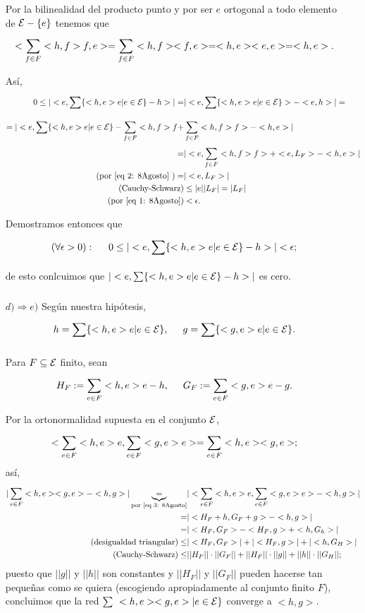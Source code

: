 \begin{itemize}
Por la bilinealidad del producto punto y por
ser $e$ ortogonal a todo elemento de $\mathcal{E}-\{ e \}$
tenemos que
\begin{equation} \label{eq 2: 8Agosto}
<\sum\limits_{f \in F}^{}<h,f>f, e> = \sum\limits_{f \in F}^{}<h,f><f,e>
= <h,e> <e,e>=<h,e>.
\end{equation}

Así,
\begin{align*}
0 \leq |<e, \sum\limits_{}^{}\{ <h,e>e | e \in \mathcal{E} \} -h > | = &
| <e, \sum\limits_{}^{}\{ <h,e>e | e \in \mathcal{E} \} > - <e,h>| = \\
=  | <e, \sum\limits_{}^{}\{ <h,e>e | e \in \mathcal{E} \} - \sum\limits_{f \in F}^{}<h,f>f
+ & \sum\limits_{f \in F}^{}<h,f>f > - <h,e> | \\
= & | <e,  \sum\limits_{f \in F}^{}<h,f>f> + <e, L_{F}> - <h,e>  | \\
(\text{por \eqref{eq 2: 8Agosto} }) = & |<e, L_{F}>| \\
(\text{Cauchy-Schwarz})&   \leq |e| |L_{F}| = |L_{F} | \\
(\text{por \eqref{eq 1: 8Agosto}})& < \epsilon.  
\end{align*}


Demostramos entonces que
\[
(\forall \epsilon > 0): \hspace{0.5cm} 
0 \leq |<e, \sum\limits_{}^{}\{ <h,e>e | e \in \mathcal{E} \} -h > |< \epsilon;
\]
de esto conlcuimos que $|<e, \sum\limits_{}^{}\{ <h,e>e | e \in \mathcal{E} \} -h > |$
es cero.

\item[$d) \Rightarrow e)$] Según nuestra hipótesis,
\[
h= \sum\limits_{}^{}\{ <h,e>e | e \in \mathcal{E} \}, \hspace{0.5cm}
g= \sum\limits_{}^{}\{ <g,e>e | e \in \mathcal{E} \}.
\]

Para $F \subseteq \mathcal{E}$ finito, sean
\[
H_{F}:= \sum\limits_{e \in F}^{}<h, e>e-h,
\hspace{0.5cm}
G_{F}:= \sum\limits_{e \in F}^{}<g, e>e-g.
\]

Por la ortonormalidad supuesta en el conjunto $\mathcal{E}$,
\begin{equation}
\label{eq 3: 8Agosto}
<\sum\limits_{e \in F}^{}<h, e>e, \sum\limits_{e \in F}^{}<g, e>e >
= \sum\limits_{e \in F}^{}<h,e><g,e>;
\end{equation}
así,
\begin{align*}
|\sum\limits_{e \in F}^{}<h,e><g,e> - <h,g>| \underbrace{=}_{\text{por 
\eqref{eq 3: 8Agosto}}} & |<\sum\limits_{e \in F}^{}<h, e>e, \sum\limits_{e \in F}^{}<g, e>e >
- <h,g>| \\
= & |<H_{F}+h, G_{F}+g > - <h,g>| \\
= & |<H_{F}, G_{F}> -<H_{F}, g> + <h,G_{h}>| \\
(\text{desigualdad triangular}) \leq & |<H_{F}, G_{F}> | + |<H_{F}, g>|
+ |<h,G_{H}>| \\
(\text{Cauchy-Schwarz}) \leq & ||H_{F}|| \cdot ||G_{F}|| +
||H_{F}|| \cdot ||g|| + ||h|| \cdot ||G_{H}||;
\end{align*}
puesto que $||g||$ y $||h||$ son constantes
y $||H_{F}||$ y $||G_{F}||$ pueden hacerse tan pequeñas como
se quiera (escogiendo apropiadamente al conjunto finito $F$),
concluimos que la red 
$\sum\limits_{}^{}\ <h,e> <g,e> | e \in \mathcal{E}\}$
converge a $<h,g>$.


\end{itemize}
